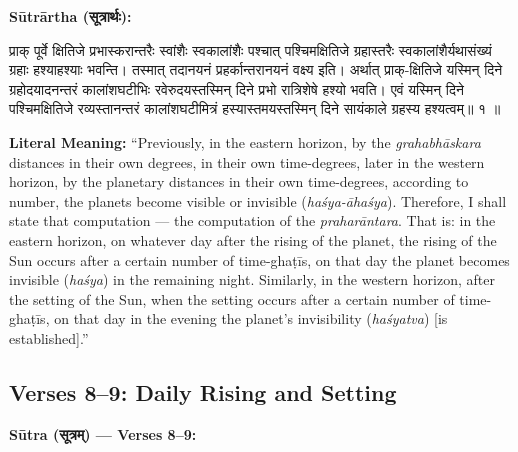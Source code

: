 \documentclass[11pt,a4paper]{article}
\newcommand{\dev}[1]{{\devanagarifont #1}}
\newenvironment{sanskritverse}{%
  \begin{center}\begin{minipage}{0.95\textwidth}
  \setlength{\leftskip}{1em}
  \setlength{\rightskip}{1em}
  \dev
}{\end{minipage}\end{center}}
\newenvironment{paracol}[1]{\begingroup}{\endgroup}
\newcommand{\switchcolumn}[1][]{%
  \ifnum#1=0\relax\else\par\nobreak\vspace{0.5em}\par\nobreak\fi%
}
\begin{document}
\vspace{0.5em}

\begin{paracol}{2}

\noindent\textbf{Sūtrārtha (\dev{सूत्रार्थः}):}
\begin{sanskritverse}
प्राक् पूर्वे क्षितिजे प्रभास्करान्तरैः स्वांशैः स्वकालांशैः पश्चात् पश्चिमक्षितिजे
ग्रहास्तरैः स्वकालांशैर्यथासंख्यं ग्रहाः हश्याहश्याः भवन्ति। तस्मात् तदानयनं
प्रहर्कान्तरानयनं वक्ष्य इति। अर्थात् प्राक्-क्षितिजे यस्मिन् दिने ग्रहोदयादनन्तरं
कालांशघटीभिः रवेरुदयस्तस्मिन् दिने प्रभो रात्रिशेषे हश्यो भवति। एवं यस्मिन् दिने
पश्चिमक्षितिजे रव्यस्तानन्तरं कालांशघटीमित्रं हस्यास्तमयस्तस्मिन् दिने सायंकाले
ग्रहस्य हश्यत्वम्॥ १ ॥
\end{sanskritverse}

\switchcolumn

\textbf{Literal Meaning:} ``Previously, in the eastern horizon, by the \textit{grahabhāskara} distances in their own degrees, in their own time-degrees, later in the western horizon, by the planetary distances in their own time-degrees, according to number, the planets become visible or invisible (\textit{haśya-āhaśya}). Therefore, I shall state that computation --- the computation of the \textit{praharāntara}. That is: in the eastern horizon, on whatever day after the rising of the planet, the rising of the Sun occurs after a certain number of time-ghaṭīs, on that day the planet becomes invisible (\textit{haśya}) in the remaining night. Similarly, in the western horizon, after the setting of the Sun, when the setting occurs after a certain number of time-ghaṭīs, on that day in the evening the planet's invisibility (\textit{haśyatva}) [is established].''

\end{paracol}

\subsection{Verses 8--9: Daily Rising and Setting}

\vspace{0.5em}
\noindent\textbf{Sūtra (\dev{सूत्रम्}) — Verses 8--9:}
\end{document}
